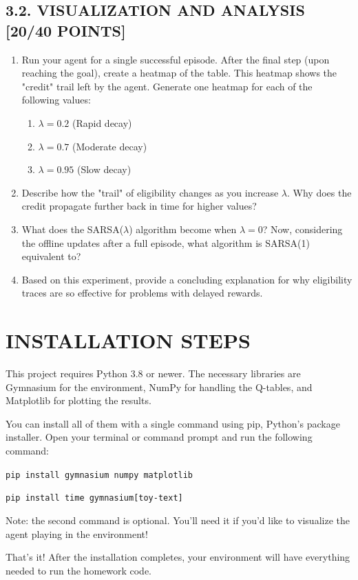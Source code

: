\documentclass{article}
\begin{document}

\subsection{3.2. VISUALIZATION AND ANALYSIS [20/40 POINTS]}

\begin{enumerate}
    \item Run your agent for a single successful episode. After the final step (upon reaching the goal), create a heatmap of the table. This heatmap shows the "credit" trail left by the agent. Generate one heatmap for each of the following values:
    \begin{enumerate}[label=\alph*.]
        \item $\lambda = 0.2$ (Rapid decay)
        \item $\lambda = 0.7$ (Moderate decay)
        \item $\lambda = 0.95$ (Slow decay)
    \end{enumerate}
    
    
    \item Describe how the "trail" of eligibility changes as you increase $\lambda$. Why does the credit propagate further back in time for higher values?
    
    
    \item What does the SARSA($\lambda$) algorithm become when $\lambda = 0$? Now, considering the offline updates after a full episode, what algorithm is SARSA(1) equivalent to?
    
    
    \item Based on this experiment, provide a concluding explanation for why eligibility traces are so effective for problems with delayed rewards.
    
\end{enumerate}

\section{INSTALLATION STEPS}

This project requires Python 3.8 or newer. The necessary libraries are Gymnasium for the environment, NumPy for handling the Q-tables, and Matplotlib for plotting the results.

You can install all of them with a single command using pip, Python's package installer. Open your terminal or command prompt and run the following command:

\texttt{pip install gymnasium numpy matplotlib}

\texttt{pip install time gymnasium[toy-text]}

Note: the second command is optional. You’ll need it if you’d like to visualize the agent playing in the environment!

That's it! After the installation completes, your environment will have everything needed to run the homework code.
\end{document}
